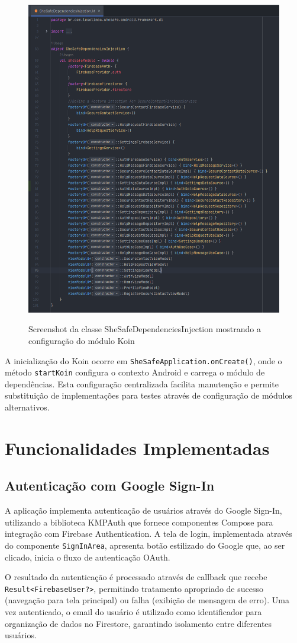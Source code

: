 \begin{figure}[H]
	\centering
	\includegraphics[width=0.4\linewidth]{images/shesafe/dependencie-injection.png}\\
	\caption{Screenshot da classe SheSafeDependenciesInjection mostrando a configuração do módulo Koin}
	\label{fig:koin_dependencies}
\end{figure}
A inicialização do Koin ocorre em \texttt{SheSafeApplication.onCreate()}, onde o método \texttt{startKoin{}} configura o contexto Android e carrega o módulo de dependências. Esta configuração centralizada facilita manutenção e permite substituição de implementações para testes através de configuração de módulos alternativos.

\section{Funcionalidades Implementadas}
\subsection{Autenticação com Google Sign-In}
A aplicação implementa autenticação de usuários através do Google Sign-In, utilizando a biblioteca KMPAuth que fornece componentes Compose para integração com Firebase Authentication. A tela de login, implementada através do componente \texttt{SignInArea}, apresenta botão estilizado do Google que, ao ser clicado, inicia o fluxo de autenticação OAuth.

O resultado da autenticação é processado através de callback que recebe \texttt{Result<FirebaseUser?>}, permitindo tratamento apropriado de sucesso (navegação para tela principal) ou falha (exibição de mensagem de erro). Uma vez autenticado, o email do usuário é utilizado como identificador para organização de dados no Firestore, garantindo isolamento entre diferentes usuários.

